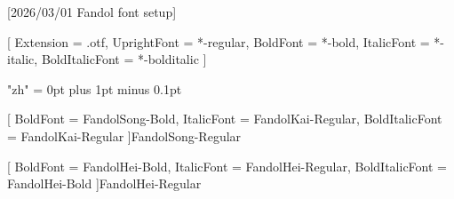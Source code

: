 
[2026/03/01 Fandol font setup]


\setsansfont{texgyreheros}[
  Extension      = .otf,
  UprightFont    = *-regular,
  BoldFont       = *-bold,
  ItalicFont     = *-italic,
  BoldItalicFont = *-bolditalic
]


\usepackage[fontset=fandol]{ctex}


\XeTeXlinebreaklocale "zh"
\XeTeXlinebreakskip = 0pt plus 1pt minus 0.1pt


\newcommand{\thmheiti}{\heiti}
\newcommand{\sectionfont}{\bfseries\heiti}
\newcommand{\pffont}{\heiti}

\renewcommand{\em}{\bfseries\heiti}


%
%
[
  BoldFont       = FandolSong-Bold,
  ItalicFont     = FandolKai-Regular,
  BoldItalicFont = FandolKai-Regular
]{FandolSong-Regular}

[
  BoldFont       = FandolHei-Bold,
  ItalicFont     = FandolHei-Regular,
  BoldItalicFont = FandolHei-Bold
]{FandolHei-Regular}

